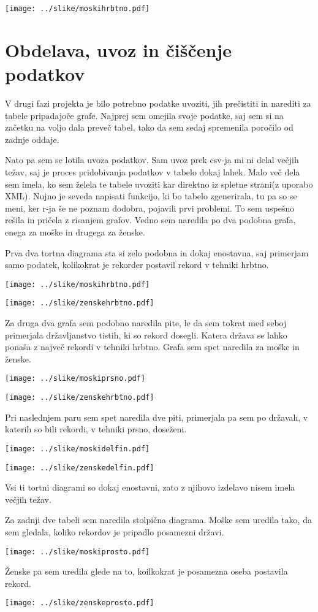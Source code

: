 \documentclass[11pt,a4paper]{article}
\begin{document}
\texttt{[image: ../slike/moskihrbtno.pdf]}


\section{Obdelava, uvoz in čiščenje podatkov}

V drugi fazi projekta je bilo potrebno podatke uvoziti, jih prečistiti in narediti za tabele pripadajoče grafe. Najprej sem omejila svoje podatke, saj sem si na začetku na voljo dala preveč tabel, tako da sem sedaj spremenila poročilo od zadnje oddaje.

Nato pa sem se lotila uvoza podatkov. Sam uvoz prek csv-ja mi ni delal večjih težav, saj je proces pridobivanja podatkov v tabelo dokaj lahek. Malo več dela sem imela, ko sem želela te tabele uvoziti kar direktno iz spletne strani(z uporabo XML). Nujno je seveda napisati funkcijo, ki bo tabelo zgenerirala, tu pa so se meni, ker r-ja še ne poznam dodobra, pojavili prvi problemi. To sem uspešno rešila in pričela z risanjem grafov. Vedno sem naredila po dva podobna grafa, enega za moške in drugega za ženske.

Prva dva tortna diagrama sta si zelo podobna in dokaj enostavna, saj primerjam samo podatek, kolikokrat je rekorder postavil rekord v tehniki hrbtno. 

\texttt{[image: ../slike/moskihrbtno.pdf]}

\texttt{[image: ../slike/zenskehrbtno.pdf]}

Za druga dva grafa sem podobno naredila pite, le da sem tokrat med seboj primerjala državljanstvo tistih, ki so rekord dosegli. Katera država se lahko ponaša z največ rekordi v tehniki hrbtno. Grafa sem spet naredila za moške in ženske.

\texttt{[image: ../slike/moskiprsno.pdf]}

\texttt{[image: ../slike/zenskehrbtno.pdf]}

Pri naslednjem paru sem spet naredila dve piti, primerjala pa sem po državah, v katerih so bili rekordi, v tehniki prsno, doseženi.

\texttt{[image: ../slike/moskidelfin.pdf]}

\texttt{[image: ../slike/zenskedelfin.pdf]}

Vsi ti tortni diagrami so dokaj enostavni, zato z njihovo izdelavo nisem imela večjih težav.

Za zadnji dve tabeli sem naredila stolpična diagrama. Moške sem uredila tako, da sem gledala, koliko rekordov je pripadlo posamezni državi.

\texttt{[image: ../slike/moskiprosto.pdf]}

Ženske pa sem uredila glede na to, koilkokrat je posamezna oseba postavila rekord.

\texttt{[image: ../slike/zenskeprosto.pdf]}
\end{document}
